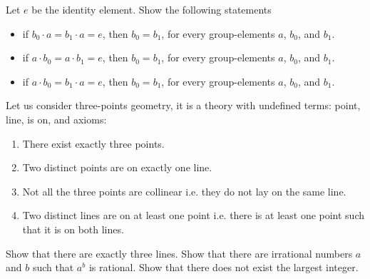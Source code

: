 \begin{exercises}
    Let $e$ be the identity element. Show the following statements
    \begin{itemize}
      \item if $b_0 \cdot a = b_1 \cdot a = e$, then $b_0 = b_1$, for every
        group-elements $a$, $b_0$, and $b_1$.
      \item if $a \cdot b_0 = a \cdot b_1 = e$, then $b_0 = b_1$, for every
        group-elements $a$, $b_0$, and $b_1$.
      \item if $a \cdot b_0 = b_1 \cdot a = e$, then $b_0 = b_1$, for every
        group-elements $a$, $b_0$, and $b_1$.
    \end{itemize}
  \exerciseitem Let us consider three-points geometry, it is a theory with
    undefined terms: point, line, is on, and axioms:
    \begin{enumerate}
        \item There exist exactly three points.
        \item Two distinct points are on exactly one line.
        \item Not all the three points are collinear i.e. they do not lay on the
            same line.
        \item Two distinct lines are on at least one point i.e. there is at
          least one point such that it is on both lines.
    \end{enumerate}

    Show that there are exactly three lines.
  \exerciseitem Show that there are irrational numbers $a$ and $b$ such that
    $a^b$ is rational.
  \exerciseitem Show that there does not exist the largest integer.
\end{exercises}
